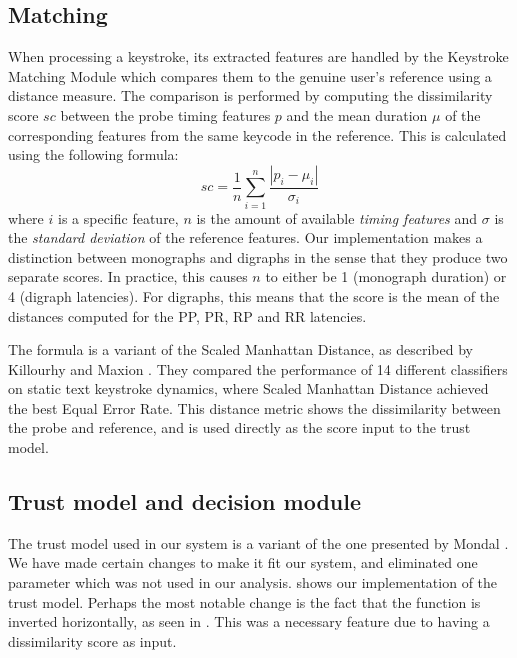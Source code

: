 \subsection{Matching}
\label{sec:system-design-CA-matching}
When processing a keystroke, its extracted features are handled by the Keystroke Matching Module which compares them to the genuine user's reference using a distance measure.
The comparison is performed by computing the dissimilarity score $sc$ between the probe timing features $p$ and the mean duration $\mu$ of the corresponding features from the same keycode in the reference.
This is calculated using the following formula:
$$ sc=\frac{1}{n}\sum_{i=1}^{n}\frac{|p_i-\mu_i|}{\sigma_i} $$
where $i$ is a specific feature, $n$ is the amount of available \textit{timing features} and $\sigma$ is the \textit{standard deviation} of the reference features.
Our implementation makes a distinction between monographs and digraphs in the sense that they produce two separate scores.
In practice, this causes $n$ to either be 1 (monograph duration) or 4 (digraph latencies).
For digraphs, this means that the score is the mean of the distances computed for the PP, PR, RP and RR latencies.

The formula is a variant of the Scaled Manhattan Distance, as described by Killourhy and Maxion \cite{Killourhy}.
They compared the performance of 14 different classifiers on static text keystroke dynamics, where Scaled Manhattan Distance achieved the best Equal Error Rate.
This distance metric shows the dissimilarity between the probe and reference, and is used directly as the score input to the trust model.


\subsection{Trust model and decision module}
The trust model used in our system is a variant of the one presented by Mondal \cite{mondal}.
We have made certain changes to make it fit our system, and eliminated one parameter which was not used in our analysis.
 shows our implementation of the trust model.
Perhaps the most notable change is the fact that the function is inverted horizontally, as seen in .
This was a necessary feature due to having a dissimilarity score as input.

